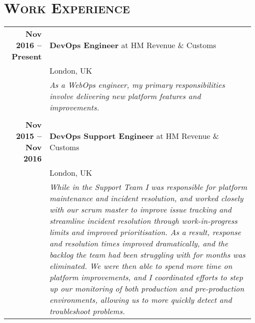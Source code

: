 \documentclass[a4paper,10pt]{article} %
\begin{document}
\section{\textsc{Work Experience}}
\centering
\begin{tabularx}{\textwidth}{r|X}
\textbf{Nov 2016 -- Present}       & \textbf{DevOps Engineer} at HM Revenue \& Customs \\
                                   & London, UK \\
                                   & \footnotesize\emph{As a WebOps engineer,
                                   my primary responsibilities involve
                                   delivering new platform features and
                                   improvements.} \\

\multicolumn{2}{r}{} \\ %

\textbf{Nov 2015 -- Nov 2016}       & \textbf{DevOps Support Engineer} at HM Revenue \& Customs \\
                                   & London, UK \\
                                   & \footnotesize\emph{While in the Support
                                   Team I was responsible for platform
                                   maintenance and incident resolution, and
                                   worked closely with our scrum master to
                                   improve issue tracking and streamline
                                   incident resolution through work-in-progress
                                   limits and improved prioritisation. As a
                                   result, response and resolution times
                                   improved dramatically, and the backlog the
                                   team had been struggling with for months was
                                   eliminated. We were then able to spend more
                                   time on platform improvements, and I
                                   coordinated efforts to step up our
                                   monitoring of both production and
                                   pre-production environments, allowing us to
                                   more quickly detect and troubleshoot
                                   problems.}\\


\end{tabularx}
\end{document}
